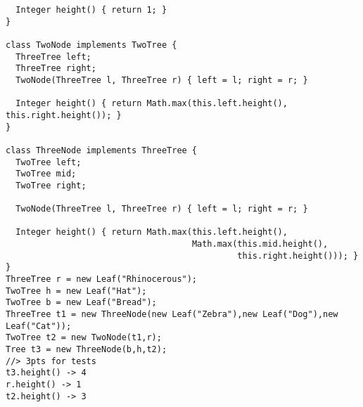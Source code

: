 \documentclass[12pt]{article}                   %
\newenvironment{solution}{\color{red}}{}
\begin{document}
\begin{problem}
\begin{solution}
\begin{verbatim}
  Integer height() { return 1; }
}

class TwoNode implements TwoTree {
  ThreeTree left;
  ThreeTree right;
  TwoNode(ThreeTree l, ThreeTree r) { left = l; right = r; }

  Integer height() { return Math.max(this.left.height(), this.right.height()); }
}

class ThreeNode implements ThreeTree {
  TwoTree left;
  TwoTree mid;
  TwoTree right;

  TwoNode(ThreeTree l, ThreeTree r) { left = l; right = r; }

  Integer height() { return Math.max(this.left.height(),
                                     Math.max(this.mid.height(),
                                              this.right.height())); }
}
ThreeTree r = new Leaf("Rhinocerous");
TwoTree h = new Leaf("Hat");
TwoTree b = new Leaf("Bread");
ThreeTree t1 = new ThreeNode(new Leaf("Zebra"),new Leaf("Dog"),new Leaf("Cat"));
TwoTree t2 = new TwoNode(t1,r);
Tree t3 = new ThreeNode(b,h,t2);
//> 3pts for tests
t3.height() -> 4
r.height() -> 1
t2.height() -> 3
\end{verbatim}
\end{solution}
\end{problem}
\newpage
\end{document}
